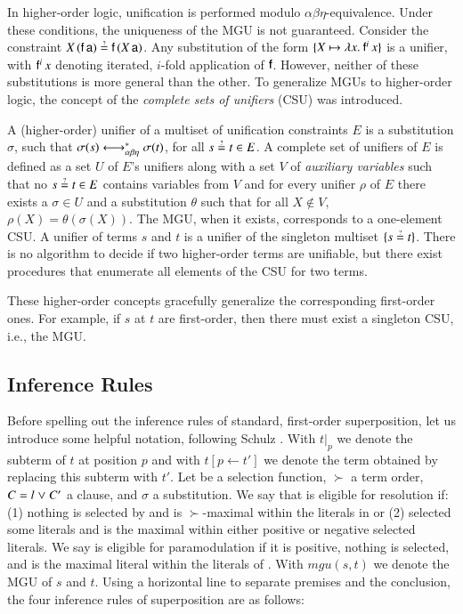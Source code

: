 In higher-order logic, unification is performed modulo
$\alpha\beta\eta$-equivalence. Under these conditions, the uniqueness of the MGU is not guaranteed. Consider the constraint $X \,
(\cst{f} \, \cst{a}) \unif \cst{f} \, (X \, \cst{a})$. Any substitution of the
form $\{ X \mapsto \lambda x.\> \mathsf{f}^i \, x \}$ is a unifier, with $\mathsf{f}^i \, x$
denoting iterated, $i$-fold application of $\mathsf{f}$. However, neither of these substitutions
is more general than the other. To generalize MGUs to higher-order logic, the concept of the {\em complete sets of unifiers} (CSU) was
introduced.

A (higher-order) unifier of a multiset of unification constraints $E$ is
a substitution $\sigma$, such that $\sigma(s) \longleftrightarrow^*_{\alpha\beta\eta} \sigma(t)$, for all $s \unif t
\in E$. A complete set of unifiers of $E$ is defined as a
set $U$ of $E$'s unifiers along with a set $V$ of \emph{auxiliary variables}
such that no $s \unif t \in E$ contains variables from $V$ and for every unifier
$\rho$ of $E$ there exists a $\sigma \in U$ and a substitution $\theta$ such
that for all $X\not\in V,$ $\rho(X) = \theta(\sigma(X))$. The MGU,
when it exists, corresponds to a one-element CSU. A unifier of terms $s$ and $t$ is a unifier of
the singleton multiset $\{ s \unif t \}$. There is no algorithm to decide
if two higher-order terms are unifiable, but there exist procedures
that enumerate all elements of the CSU for two terms.

These higher-order concepts gracefully generalize the corresponding first-order
ones. For example, if $s$ at $t$ are first-order, then there must exist a singleton
CSU, i.e., the MGU. 

\subsection{Inference Rules}
\label{sec:pre:rules}
\newcommand{\mgu}{\ensuremath{\mathit{mgu}}}

Before spelling out the inference rules of standard, first-order superposition,
let us introduce some helpful notation, following Schulz \cite{ss-02-brainiac}.
With $t|_p$ we denote the subterm of $t$ at position $p$ and with $t[p \leftarrow
t']$  we denote the term obtained by replacing this subterm with $t'$. Let \selfun{} be a selection function,
$\succ$ a term order, $C = l \mathrel\lor C'$ a clause, and $\sigma$ a
substitution. We say that  is eligible for resolution if: (1) nothing
is selected by \selfun{} and  is $\succ$-maximal within the literals in
 or (2) \selfun{} selected some literals and  is the maximal
within either positive or negative selected literals. We say  is
eligible for paramodulation if it is positive, nothing is selected, and
 is the maximal literal within the literals of .  With
$\mgu(s,t)$ we denote the MGU of $s$ and $t$. Using a horizontal
line to separate premises and the conclusion, the four inference rules of
superposition are as follows:

